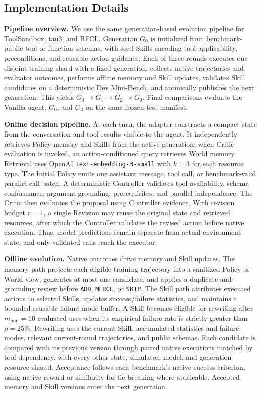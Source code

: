 \subsection{Implementation Details}

\textbf{Pipeline overview.} We use the same generation-based evolution pipeline for ToolSandbox, tau3, and BFCL. Generation \(G_0\) is initialized from benchmark-public tool or function schemas, with seed Skills encoding tool applicability, preconditions, and reusable action guidance. Each of three rounds executes one disjoint training shard with a fixed generation, collects native trajectories and evaluator outcomes, performs offline memory and Skill updates, validates Skill candidates on a deterministic Dev Mini-Bench, and atomically publishes the next generation. This yields \(G_0\rightarrow G_1\rightarrow G_2\rightarrow G_3\). Final comparisons evaluate the Vanilla agent, \(G_0\), and \(G_3\) on the same frozen test manifest.

\textbf{Online decision pipeline.} At each turn, the adapter constructs a compact state from the conversation and tool results visible to the agent. It independently retrieves Policy memory and Skills from the active generation; when Critic evaluation is invoked, an action-conditioned query retrieves World memory. Retrieval uses OpenAI \texttt{text-embedding-3-small} with \(k=3\) for each resource type. The Initial Policy emits one assistant message, tool call, or benchmark-valid parallel call batch. A deterministic Controller validates tool availability, schema conformance, argument grounding, prerequisites, and parallel independence. The Critic then evaluates the proposal using Controller evidence. With revision budget \(r=1\), a single Revision may reuse the original state and retrieved resources, after which the Controller validates the revised action before native execution. Thus, model predictions remain separate from actual environment state, and only validated calls reach the executor.

\textbf{Offline evolution.} Native outcomes drive memory and Skill updates. The memory path projects each eligible training trajectory into a sanitized Policy or World view, generates at most one candidate, and applies a duplicate-and-grounding review before \texttt{ADD}, \texttt{MERGE}, or \texttt{SKIP}. The Skill path attributes executed actions to selected Skills, updates success/failure statistics, and maintains a bounded reusable failure-mode buffer. A Skill becomes eligible for rewriting after \(m_{\min}=10\) evaluated uses when its empirical failure rate is strictly greater than \(\rho=25\%\). Rewriting uses the current Skill, accumulated statistics and failure modes, relevant current-round trajectories, and public schemas. Each candidate is compared with its previous version through paired native executions matched by tool dependency, with every other state, simulator, model, and generation resource shared. Acceptance follows each benchmark's native success criterion, using native reward or similarity for tie-breaking where applicable. Accepted memory and Skill versions enter the next generation.

